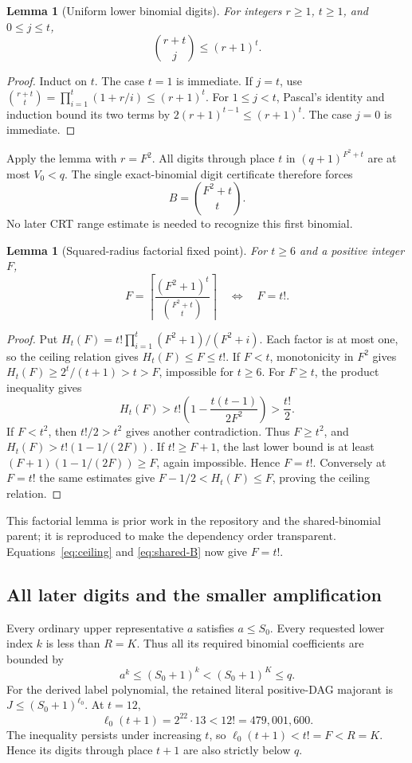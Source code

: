 \documentclass[11pt,letterpaper]{article}
\newcommand{\ceil}[1]{\left\lceil#1\right\rceil}
\newtheorem{lemma}[theorem]{Lemma}
\theoremstyle{remark}\newtheorem{remark}[theorem]{Remark}
\begin{document}
\begin{lemma}[Uniform lower binomial digits]\label{lem:binomial-bound}
For integers $r\ge1$, $t\ge1$, and $0\le j\le t$,
\[
 \binom{r+t}{j}\le(r+1)^t.
\]
\end{lemma}
\begin{proof}
Induct on $t$.  The case $t=1$ is immediate.  If $j=t$, use
$\binom{r+t}{t}=\prod_{i=1}^t(1+r/i)\le(r+1)^t$.
For $1\le j<t$, Pascal's identity and induction bound its two terms by
$2(r+1)^{t-1}\le(r+1)^t$.  The case $j=0$ is immediate.
\end{proof}
Apply the lemma with $r=F^2$.  All digits through place $t$ in
$(q+1)^{F^2+t}$ are at most $V_0<q$.  The single exact-binomial digit
certificate therefore forces
\begin{equation}\label{eq:shared-B}
 B=\binom{F^2+t}{t}.
\end{equation}
No later CRT range estimate is needed to recognize this first binomial.

\begin{lemma}[Squared-radius factorial fixed point]\label{lem:factorial}
For $t\ge6$ and a positive integer $F$,
\[
 F=\ceil{\frac{(F^2+1)^t}{\binom{F^2+t}{t}}}
 \quad\Longleftrightarrow\quad F=t!.
\]
\end{lemma}
\begin{proof}
Put $H_t(F)=t!\prod_{i=1}^t(F^2+1)/(F^2+i)$.  Each factor is at most
one, so the ceiling relation gives $H_t(F)\le F\le t!$.
If $F<t$, monotonicity in $F^2$ gives
$H_t(F)\ge2^t/(t+1)>t>F$, impossible for $t\ge6$.
For $F\ge t$, the product inequality gives
\[
 H_t(F)>t!\left(1-\frac{t(t-1)}{2F^2}\right)>\frac{t!}{2}.
\]
If $F<t^2$, then $t!/2>t^2$ gives another contradiction.  Thus
$F\ge t^2$, and
$H_t(F)>t!(1-1/(2F))$.  If $t!\ge F+1$, the last lower bound is at
least $(F+1)(1-1/(2F))\ge F$, again impossible.  Hence $F=t!$.
Conversely at $F=t!$ the same estimates give
$F-1/2<H_t(F)\le F$, proving the ceiling relation.
\end{proof}
This factorial lemma is prior work in the repository and the
shared-binomial parent; it is reproduced to make the dependency order
transparent.  Equations~\eqref{eq:ceiling} and \eqref{eq:shared-B} now
give $F=t!$.

\subsection{All later digits and the smaller amplification}

Every ordinary upper representative $a$ satisfies $a\le S_0$.  Every
requested lower index $k$ is less than $R=K$.  Thus all its required
binomial coefficients are bounded by
\[
 a^k\le(S_0+1)^k<(S_0+1)^K\le q.
\]
For the derived label polynomial, the retained literal positive-DAG
majorant is $J\le(S_0+1)^{\ell_0}$.  At $t=12$,
\[
 \ell_0(t+1)=2^{22}\cdot13<12!=479,001,600.
\]
The inequality persists under increasing $t$, so
$\ell_0(t+1)<t!=F<R=K$.  Hence its digits through place $t+1$ are also
strictly below $q$.
\end{document}

